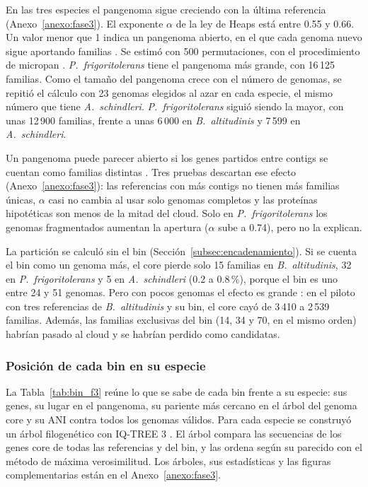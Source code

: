 En las tres especies el pangenoma sigue creciendo con la última referencia
(Anexo~\ref{anexo:fase3}). El exponente $\alpha$ de la ley de Heaps está
entre 0.55 y 0.66. Un valor menor que 1 indica un pangenoma abierto, en el que
cada genoma nuevo sigue aportando familias \cite{tettelin2008}. Se estimó con
500 permutaciones, con el procedimiento de micropan \cite{snipen2015}. \textit{P.~frigoritolerans} tiene el pangenoma más grande, con 16\,125
familias. Como el tamaño del pangenoma crece con el número de genomas, se
repitió el cálculo con 23 genomas elegidos al azar en cada especie, el mismo
número que tiene \textit{A.~schindleri}. \textit{P.~frigoritolerans} siguió
siendo la mayor, con unas 12\,900 familias, frente a unas 6\,000 en
\textit{B.~altitudinis} y 7\,599 en \textit{A.~schindleri}.

Un pangenoma puede parecer abierto si los genes partidos entre contigs se
cuentan como familias distintas \cite{denton2014,panaroo2020}. Tres pruebas
descartan ese efecto (Anexo~\ref{anexo:fase3}): las referencias con más contigs
no tienen más familias únicas, $\alpha$ casi no cambia al usar solo genomas
completos y las proteínas hipotéticas son menos de la mitad del cloud. Solo en
\textit{P.~frigoritolerans} los genomas fragmentados aumentan la apertura
($\alpha$ sube a 0.74), pero no la explican.


La partición se calculó sin el bin (Sección~\ref{subsec:encadenamiento}). Si se
cuenta el bin como un genoma más, el core pierde solo 15 familias en
\textit{B.~altitudinis}, 32 en \textit{P.~frigoritolerans} y 5 en
\textit{A.~schindleri} (0.2 a 0.8\,\%), porque el bin es uno entre 24 y 51
genomas. Pero con pocos genomas el efecto es grande \cite{liyin2022}: en el
piloto con tres referencias de \textit{B.~altitudinis} y su bin, el core cayó de
3\,410 a 2\,539 familias. Además, las familias exclusivas del bin (14, 34 y 70,
en el mismo orden) habrían pasado al cloud y se habrían perdido como
candidatas.

\subsubsection{Posición de cada bin en su especie}
\label{subsubsec:res_arboles}

La Tabla~\ref{tab:bin_f3} reúne lo que se sabe de cada bin frente a su especie:
sus genes, su lugar en el pangenoma, su pariente más cercano en el árbol del
genoma core y su ANI contra todos los genomas válidos. Para cada especie se construyó un árbol filogenético con IQ-TREE 3
\cite{wong2026iqtree3}. El árbol compara las secuencias de los genes core de
todas las referencias y del bin, y las ordena según su parecido con el método
de máxima verosimilitud. Los árboles, sus estadísticas y las
figuras complementarias están en el Anexo~\ref{anexo:fase3}.


